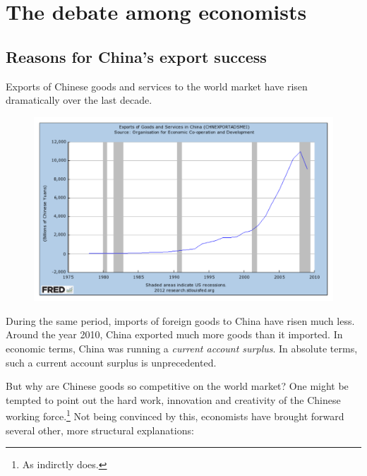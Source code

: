 \section{The debate among economists}

\subsection{Reasons for China's export success}

Exports of Chinese goods and services to the world market have risen dramatically over the last decade. %
   
     \begin{figure}[h]
     \begin{center}
     \includegraphics[width=1\textwidth]{ExportsChinaFRED.pdf}
     \end{center}
     \end{figure}

During the same period, imports of foreign goods to China have risen much less. Around the year 2010, China exported much more goods than it imported. In economic terms, China was running a \emph{current account surplus}. In absolute terms, such a current account surplus  is unprecedented. %

But why are Chinese goods so competitive on the world market? One might be tempted to point out the hard work, innovation and creativity of the Chinese working force.\footnote{As \cite[p. 18]{Yu2010} indirctly does.} Not being convinced by this, economists have brought forward several other, more structural explanations:

